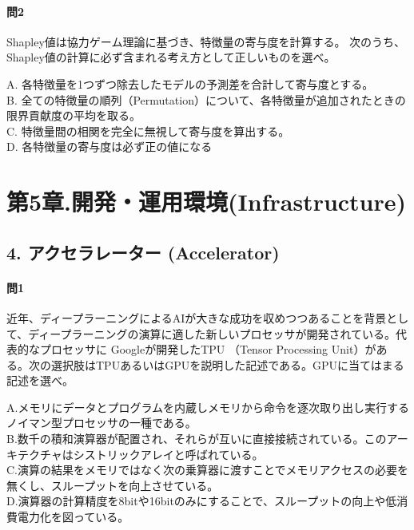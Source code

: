 \documentclass[
  letterpaper,
  DIV=11,
  numbers=noendperiod]{scrreprt}
\begin{document}
\subsection{問2}\label{ux554f2-6}

Shapley値は協力ゲーム理論に基づき、特徴量の寄与度を計算する。
次のうち、Shapley値の計算に必ず含まれる考え方として正しいものを選べ。

A. 各特徴量を1つずつ除去したモデルの予測差を合計して寄与度とする。\\
B.
全ての特徴量の順列（Permutation）について、各特徴量が追加されたときの限界貢献度の平均を取る。\\
C. 特徴量間の相関を完全に無視して寄与度を算出する。\\
D. 各特徴量の寄与度は必ず正の値になる

\part{第5章.開発・運用環境(Infrastructure)}

\chapter{4. アクセラレーター
(Accelerator)}\label{ux30a2ux30afux30bbux30e9ux30ecux30fcux30bfux30fc-accelerator}

\subsection{問1}\label{ux554f1-11}

近年、ディープラーニングによるAIが大きな成功を収めつつあることを背景として、ディープラーニングの演算に適した新しいプロセッサが開発されている。代表的なプロセッサに
Googleが開発したTPU （Tensor Processing
Unit）がある。次の選択肢はTPUあるいはGPUを説明した記述である。GPUに当てはまる記述を選べ。

A.メモリにデータとプログラムを内蔵しメモリから命令を逐次取り出し実行するノイマン型プロセッサの一種である。\\
B.数千の積和演算器が配置され、それらが互いに直接接続されている。このアーキテクチャはシストリックアレイと呼ばれている。\\
C.演算の結果をメモリではなく次の乗算器に渡すことでメモリアクセスの必要を無くし、スループットを向上させている。\\
D.演算器の計算精度を8bitや16bitのみにすることで、スループットの向上や低消費電力化を図っている。

\end{document}
